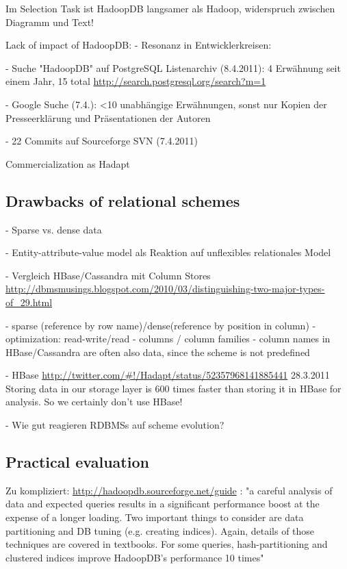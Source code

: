 \documentclass[12pt,a4paper]{scrartcl}		%
\begin{document}
Im Selection Task ist HadoopDB langsamer als Hadoop, widerspruch zwischen Diagramm und Text!




Lack of impact of HadoopDB:
  - Resonanz in Entwicklerkreisen:

    - Suche "HadoopDB" auf PostgreSQL Listenarchiv (8.4.2011): 4 Erwähnung seit einem Jahr, 15 total
      \url{http://search.postgresql.org/search?m=1}

    - Google Suche (7.4.): <10 unabhängige Erwähnungen, sonst nur Kopien der Presseerklärung und Präsentationen der Autoren

    - 22 Commits auf Sourceforge SVN (7.4.2011)

Commercialization as Hadapt

\subsection{Drawbacks of relational schemes}
  - Sparse vs. dense data

  - Entity-attribute-value model als Reaktion auf unflexibles relationales Model

  - Vergleich HBase/Cassandra mit Column Stores
    \url{http://dbmsmusings.blogspot.com/2010/03/distinguishing-two-major-types-of_29.html}

    - sparse (reference by row name)/dense(reference by position in column)
    - optimization: read-write/read
    - columns / column families
    - column names in HBase/Cassandra are often also data, since the scheme is not predefined

  - HBase 
    \url{http://twitter.com/#!/Hadapt/status/52357968141885441}
    28.3.2011 Storing data in our storage layer is 600 times faster than storing it in HBase for analysis. So we certainly don't use HBase!

- Wie gut reagieren RDBMSs auf scheme evolution?

\subsection{Practical evaluation}

Zu kompliziert:
\url{http://hadoopdb.sourceforge.net/guide} :
"a careful analysis of data and expected queries results in a significant performance boost at the expense of a longer loading. Two important things to consider are data partitioning and DB tuning (e.g. creating indices). Again, details of those techniques are covered in textbooks. For some queries, hash-partitioning and clustered indices improve HadoopDB's performance 10 times"
\end{document}
